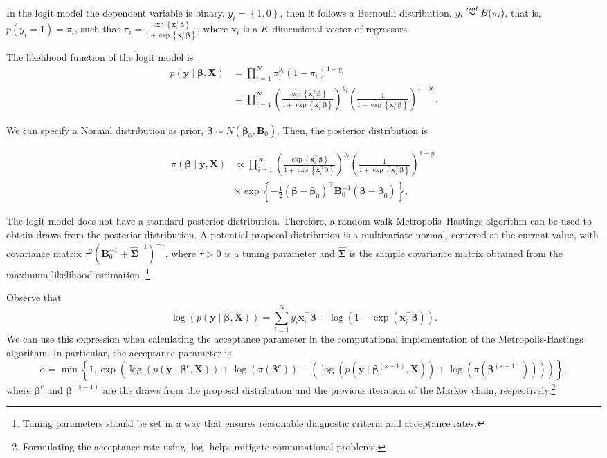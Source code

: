 In the logit model the dependent variable is binary, $y_i=\left\{1,0\right\}$, then it follows a Bernoulli distribution, $y_i\stackrel{ind} {\thicksim}B(\pi_i)$, that is, $p(y_i=1)=\pi_i$, such that $\pi_i=\frac{\exp\left\{{\bm{x}}_i^{\top}\bm{\beta}\right\}}{1+\exp\left\{{\bm{x}}_i^{\top}\bm{\beta}\right\}}$, where $\bm x_i$ is a $K$-dimensional vector of regressors.

The likelihood function of the logit model is
\begin{align*}
	p({\bm{y}}\mid \bm{\beta},{\bm{X}})&=\prod_{i=1}^N \pi_i^{y_i}(1-\pi_i)^{1-y_i}\\
	&=\prod_{i=1}^N\left(\frac{\exp\left\{{\bm{x}}_i^{\top}\bm{\beta}\right\}}{1+\exp\left\{{\bm{x}}_i^{\top}\bm{\beta}\right\}}\right)^{y_i}\left(\frac{1}{1+\exp\left\{{\bm{x}}_i^{\top}\bm{\beta}\right\}}\right)^{1-y_i}.
\end{align*}

We can specify a Normal distribution as prior, $\bm{\beta}\sim N({\bm{\beta}}_0,{\bm{B}}_0)$. Then, the posterior distribution is

\begin{align*}
	\pi(\bm{\beta}\mid {\bm{y}},{\bm{X}})&\propto\prod_{i=1}^N\left(\frac{\exp\left\{{\bm{x}}_i^{\top}\bm{\beta}\right\}}{1+\exp\left\{{\bm{x}}_i^{\top}\bm{\beta}\right\}}\right)^{y_i}\left(\frac{1}{1+\exp\left\{{\bm{x}}_i^{\top}\bm{\beta}\right\}}\right)^{1-y_i}\\
	&\times\exp\left\{-\frac{1}{2}(\bm{\beta}-\bm{\beta}_0)^{\top}\bm{B}_0^{-1}(\bm{\beta}-\bm{\beta}_0)\right\}.
\end{align*}

The logit model does not have a standard posterior distribution. Therefore, a random walk Metropolis--Hastings algorithm can be used to obtain draws from the posterior distribution. A potential proposal distribution is a multivariate normal, centered at the current value, with covariance matrix $\tau^2({\bm{B}}_0^{-1} + \widehat{{\bm{\Sigma}}}^{-1})^{-1}$, where $\tau > 0$ is a tuning parameter and $\widehat{\bm{\Sigma}}$ is the sample covariance matrix obtained from the maximum likelihood estimation \cite{Martin2011}.\footnote{Tuning parameters should be set in a way that ensures reasonable diagnostic criteria and acceptance rates.}

Observe that 
\[
\log(p({\bm{y}} \mid \bm{\beta}, {\bm{X}})) = \sum_{i=1}^N y_i {\bm{x}}_i^{\top} \bm{\beta} - \log(1 + \exp({\bm{x}}_i^{\top} \bm{\beta})).
\]
We can use this expression when calculating the acceptance parameter in the computational implementation of the Metropolis-Hastings algorithm. In particular, the acceptance parameter is
\[
\alpha = \min\left\{1, \exp\left(\log(p({\bm{y}} \mid \bm{\beta}^{c}, {\bm{X}})) + \log(\pi(\bm{\beta}^c)) - \left(\log(p({\bm{y}} \mid \bm{\beta}^{(s-1)}, {\bm{X}})) + \log(\pi(\bm{\beta}^{(s-1)}))\right)\right)\right\},
\]
where $\bm{\beta}^c$ and $\bm{\beta}^{(s-1)}$ are the draws from the proposal distribution and the previous iteration of the Markov chain, respectively.\footnote{Formulating the acceptance rate using $\log$ helps mitigate computational problems.}

